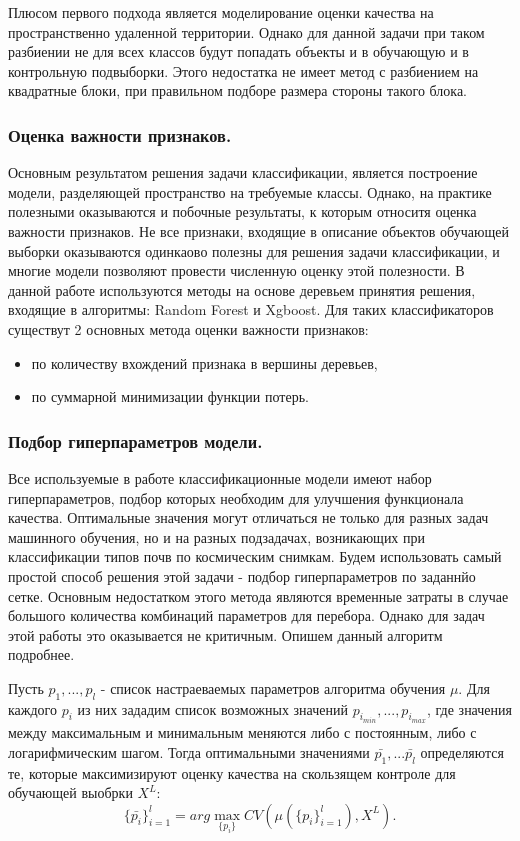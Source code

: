 \documentclass[14pt]{extarticle}
\begin{document}
Плюсом первого подхода является моделирование оценки качества на
пространственно удаленной территории. Однако для данной задачи при таком разбиении
не для всех классов будут попадать объекты и в обучающую и в контрольную подвыборки.
Этого недостатка не имеет метод с разбиением на квадратные блоки, при правильном
подборе размера стороны такого блока.
\par

\subsubsection{Оценка важности признаков.}

\par
Основным результатом решения задачи классификации, является построение модели, разделяющей
пространство на требуемые классы. Однако, на практике полезными оказываются и побочные результаты,
к которым относитя оценка важности признаков. Не все признаки, входящие в описание объектов
обучающей выборки оказываются одинкаово полезны для решения задачи классификации, и многие
модели позволяют провести численную оценку этой полезности. В данной работе используются методы
на основе деревьем принятия решения, входящие в алгоритмы: Random Forest и Xgboost. 
Для таких классификаторов существут 2 основных метода оценки важности признаков:
\begin{itemize}
    \item по количеству вхождений признака в вершины деревьев,
    \item по суммарной минимизации функции потерь.
\end{itemize}

\subsubsection{Подбор гиперпараметров модели.}

\par
Все используемые в работе классификационные модели имеют набор гиперпараметров, подбор которых
необходим для улучшения функционала качества. Оптимальные значения могут отличаться не только
для разных задач машинного обучения, но и на разных подзадачах, возникающих при классификации
типов почв по космическим снимкам. Будем использовать самый простой способ решения этой задачи - 
подбор гиперпараметров по заданнйо сетке. Основным недостатком этого метода являются
временные затраты в случае большого количества комбинаций параметров для перебора.
Однако для задач этой работы это оказывается не критичным. Опишем данный алгоритм подробнее.
\par
Пусть $p_1, ..., p_l$ - список настраеваемых параметров алгоритма обучения $\mu$.
Для каждого $p_i$ из них зададим список возможных значений $p_{i_{min}}, ..., p_{i_{max}}$,
где значения между максимальным и минимальным меняются либо с постоянным,
либо с логарифмическим шагом. Тогда оптимальными значениями $\bar{p_1}, ... \bar{p_l}$
определяются те, которые максимизируют оценку качества на скользящем контроле для
обучающей выобрки $X^L$:
\[
    \{\bar{p_i}\}_{i=1}^l=arg\max_{\{p_i\}} CV(\mu(\{p_i\}_{i=1}^l), X^L).
\]
\end{document}
